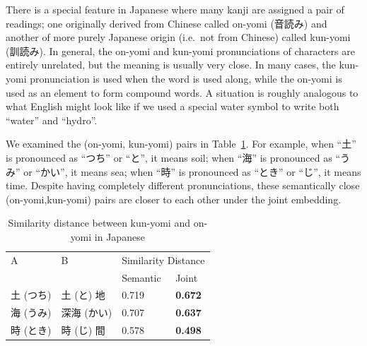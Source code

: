 \begin{CJK}{UTF8}{ipxm}
    There is a special feature in Japanese where many kanji are assigned a pair of readings; one originally derived from Chinese called on-yomi (音読み) and another of more purely Japanese origin (i.e.\ not from Chinese) called kun-yomi (訓読み).  In general, the on-yomi and kun-yomi pronunciations of characters are entirely unrelated, but the meaning is usually very close. In many cases, the kun-yomi pronunciation is used when the word is used along, while the on-yomi is used as an element to form compound words.  A situation is roughly analogous to what English might look like if we used a special water symbol to write both ``water'' and ``hydro''.  

We examined the (on-yomi, kun-yomi) pairs in Table~\ref{tab:analysis_heteronym3}. For example, when ``土'' is pronounced as ``つち'' or ``と'', it means soil; when ``海'' is pronounced as ``うみ'' or ``かい'', it means sea; when ``時'' is pronounced as ``とき'' or ``じ'', it means time.  Despite having completely different pronunciations, these semantically close (on-yomi,kun-yomi) pairs are closer to each other under the joint embedding.
\end{CJK}

\vspace{0.1cm}    
\begin{table}[h]
    \centering
    \begin{CJK}{UTF8}{ipxm}
        \begin{tabularx}{\textwidth}{bbbb}
            \toprule
            \multirow{2.5}{*}{A} & \multirow{2.5}{*}{B} & \multicolumn{2}{c}{Similarity Distance} \\
            \cmidrule(lr){3-4} {} & {} & Semantic & Joint \\\midrule
            土 (つち) & 土 (と) 地 & 0.719 & \textbf{0.672} \\
            海 (うみ) & 深海 (かい) & 0.707 & \textbf{0.637} \\
            時 (とき) & 時 (じ) 間 & 0.578 & \textbf{0.498} \\\bottomrule
        \end{tabularx}
    \end{CJK}
    \caption{Similarity distance between kun-yomi and on-yomi in Japanese}
    \label{tab:analysis_heteronym3}
\end{table}
